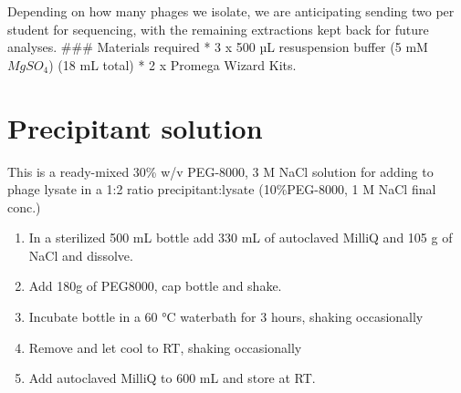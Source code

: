 \documentclass[
]{book}
\providecommand{\tightlist}{%
  \setlength{\itemsep}{0pt}\setlength{\parskip}{0pt}}
\begin{document}
Depending on how many phages we isolate, we are anticipating sending two per student for sequencing, with the remaining extractions kept back for future analyses.
\#\#\# Materials required
* 3 x 500 µL resuspension buffer (5 mM \(MgSO_{4}\)) (18 mL total)
* 2 x Promega Wizard Kits.

\hypertarget{precipitant-solution}{%
\chapter{Precipitant solution}\label{precipitant-solution}}

This is a ready-mixed 30\% w/v PEG-8000, 3 M NaCl solution for adding to phage lysate in a 1:2 ratio precipitant:lysate (10\%PEG-8000, 1 M NaCl final conc.)

\begin{enumerate}
\def\labelenumi{\arabic{enumi}.}
\tightlist
\item
  In a sterilized 500 mL bottle add 330 mL of autoclaved MilliQ and 105 g of NaCl and dissolve.
\item
  Add 180g of PEG8000, cap bottle and shake.
\item
  Incubate bottle in a 60 °C waterbath for 3 hours, shaking occasionally
\item
  Remove and let cool to RT, shaking occasionally
\item
  Add autoclaved MilliQ to 600 mL and store at RT.
\end{enumerate}

  
\end{document}
